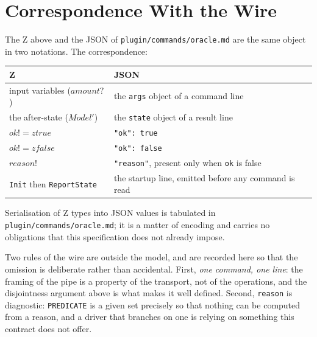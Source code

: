 \documentclass[a4paper,10pt,fleqn]{article}
\begin{document}
\section{Correspondence With the Wire}

The Z above and the JSON of \texttt{plugin/commands/oracle.md} are the same
object in two notations. The correspondence:

\begin{center}
\begin{tabular}{ll}
  \textbf{Z} & \textbf{JSON} \\
  \hline
  input variables ($amount?$)     & the \texttt{args} object of a command line \\
  the after-state ($Model'$)      & the \texttt{state} object of a result line \\
  $ok! = ztrue$                   & \texttt{"ok": true} \\
  $ok! = zfalse$                  & \texttt{"ok": false} \\
  $reason!$                       & \texttt{"reason"}, present only when \texttt{ok} is false \\
  \texttt{Init} then \texttt{ReportState} & the startup line, emitted before any command is read \\
\end{tabular}
\end{center}

Serialisation of Z types into JSON values is tabulated in
\texttt{plugin/commands/oracle.md}; it is a matter of encoding and carries no
obligations that this specification does not already impose.

Two rules of the wire are outside the model, and are recorded here so
that the omission is deliberate rather than accidental. First,
\emph{one command, one line}: the framing of the pipe is a property of
the transport, not of the operations, and the disjointness argument above
is what makes it well defined. Second, \texttt{reason} is diagnostic:
\texttt{PREDICATE} is a given set precisely so that nothing can be
computed from a reason, and a driver that branches on one is relying on
something this contract does not offer.
\end{document}
